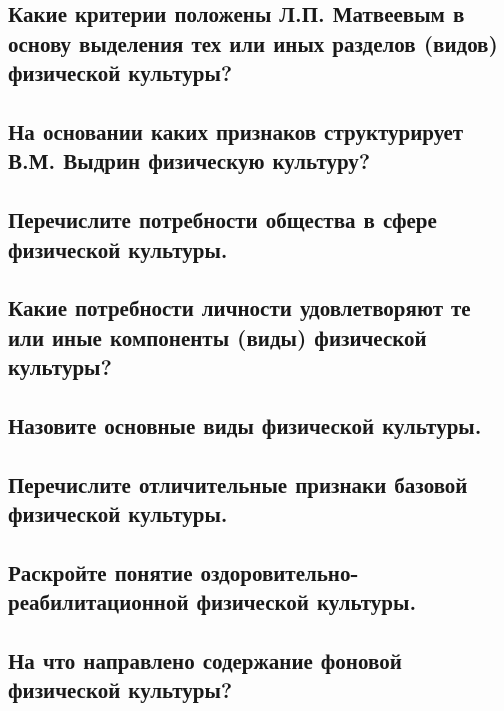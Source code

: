 \subsection{Какие критерии положены Л.П. Матвеевым в основу выделения тех или иных разделов (видов) физической культуры?}



\subsection{На основании каких признаков структурирует В.М. Выдрин физическую культуру?}



\subsection{Перечислите потребности общества в сфере физической культуры.}



\subsection{Какие потребности личности удовлетворяют те или иные компоненты (виды) физической культуры?}



\subsection{Назовите основные виды физической культуры.}



\subsection{Перечислите отличительные признаки базовой физической культуры.}



\subsection{Раскройте понятие оздоровительно-реабилитационной физической культуры.}



\subsection{На что направлено содержание фоновой физической культуры?}



